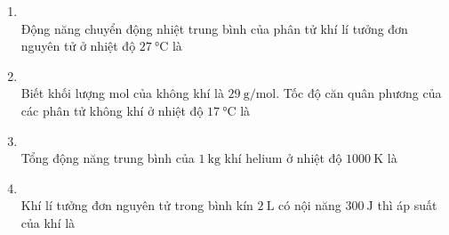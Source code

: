 \begin{enumerate}[label=\bfseries Câu \arabic*:, leftmargin=1.7cm]
\item {}\\
Động năng chuyển động nhiệt trung bình của phân tử khí lí tưởng đơn nguyên tử ở nhiệt độ $\SI{27}{\celsius}$ là

\item {}\\
Biết khối lượng mol của không khí là $\SI{29}{\gram/\mole}$. Tốc độ căn quân phương của các phân tử không khí ở nhiệt độ $\SI{17}{\celsius}$ là

\item {}\\
Tổng động năng trung bình của $\SI{1}{\kilogram}$ khí helium ở nhiệt độ $\SI{1000}{\kelvin}$ là

\item {}\\
Khí lí tưởng đơn nguyên tử trong bình kín $\SI{2}{\liter}$ có nội năng $\SI{300}{\joule}$ thì áp suất của khí là 


\end{enumerate}

